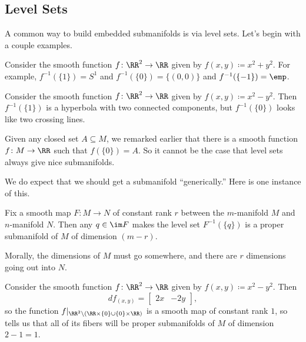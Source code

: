 \documentclass[../notes.tex]{subfiles}
\begin{document}
\subsection{Level Sets}
A common way to build embedded submanifolds is via level sets. Let's begin with a couple examples.
\begin{example}
	Consider the smooth function $f\colon\RR^2\to\RR$ given by $f(x,y)\coloneqq x^2+y^2$. For example, $f^{-1}(\{1\})=S^1$ and $f^{-1}(\{0\})=\{(0,0)\}$ and $f^{-1}(\{-1\})=\emp$.
\end{example}
\begin{example}
	Consider the smooth function $f\colon\RR^2\to\RR$ given by $f(x,y)\coloneqq x^2-y^2$. Then $f^{-1}(\{1\})$ is a hyperbola with two connected components, but $f^{-1}(\{0\})$ looks like two crossing lines.
\end{example}
\begin{remark}
	Given any closed set $A\subseteq M$, we remarked earlier that there is a smooth function $f\colon M\to\RR$ such that $f(\{0\})=A$. So it cannot be the case that level sets always give nice submanifolds.
\end{remark}
We do expect that we should get a submanifold ``generically.'' Here is one instance of this.
\begin{theorem} \label{thm:level-sub}
	Fix a smooth map $F\colon M\to N$ of constant rank $r$ between the $m$-manifold $M$ and $n$-manifold $N$. Then any $q\in\im F$ makes the level set $F^{-1}(\{q\})$ is a proper submanifold of $M$ of dimension $(m-r)$.
\end{theorem}
Morally, the dimensions of $M$ must go somewhere, and there are $r$ dimensions going out into $N$.
\begin{example}
	Consider the smooth function $f\colon\RR^2\to\RR$ given by $f(x,y)\coloneqq x^2-y^2$. Then
	\[df_{(x,y)}=\begin{bmatrix}
		2x & -2y
	\end{bmatrix},\]
	so the function $f|_{\RR^2\setminus(\RR\times\{0\}\cup\{0\}\times\RR)}$ is a smooth map of constant rank $1$, so  tells us that all of its fibers will be proper submanifolds of $M$ of dimension $2-1=1$.
\end{example}
\end{document}
